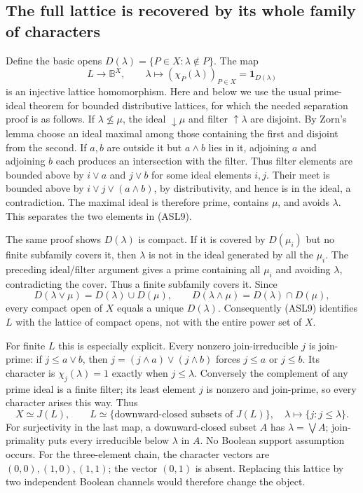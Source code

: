 \subsection{The full lattice is recovered by its whole family of characters}

Define the basic opens $D(\lambda)=\{P\in X:\lambda\notin P\}$.
The map
\begin{equation}\tag{ASL9}
 L\longrightarrow\mathbb B^X,\qquad
 \lambda\longmapsto(\chi_P(\lambda))_{P\in X}
                =\mathbf1_{D(\lambda)}
\end{equation}
is an injective lattice homomorphism. Here and below we use the usual
prime-ideal theorem for bounded distributive lattices, for which the
needed separation proof is as follows. If $\lambda\nleq\mu$, the
ideal $\downarrow\mu$ and filter $\uparrow\lambda$ are disjoint.
By Zorn's lemma choose an ideal maximal among those containing the
first and disjoint from the second. If $a,b$ are outside it but
$a\wedge b$ lies in it, adjoining $a$ and adjoining $b$ each produces
an intersection with the filter. Thus filter elements are bounded
above by $i\vee a$ and $j\vee b$ for some ideal elements $i,j$.
Their meet is bounded above by $i\vee j\vee(a\wedge b)$, by
distributivity, and hence is in the ideal, a contradiction. The
maximal ideal is therefore prime, contains $\mu$, and avoids
$\lambda$. This separates the two elements in (ASL9).

The same proof shows $D(\lambda)$ is compact. If it is covered by
$D(\mu_i)$ but no finite subfamily covers it, then $\lambda$ is not
in the ideal generated by all the $\mu_i$. The preceding ideal/filter
argument gives a prime containing all $\mu_i$ and avoiding $\lambda$,
contradicting the cover. Thus a finite subfamily covers it. Since
\begin{equation}\tag{ASL10}
 D(\lambda\vee\mu)=D(\lambda)\cup D(\mu),\qquad
 D(\lambda\wedge\mu)=D(\lambda)\cap D(\mu),
\end{equation}
every compact open of $X$ equals a unique $D(\lambda)$. Consequently
(ASL9) identifies $L$ with the lattice of compact opens, not with the
entire power set of $X$.

For finite $L$ this is especially explicit. Every nonzero
join-irreducible $j$ is join-prime: if $j\le a\vee b$, then
$j=(j\wedge a)\vee(j\wedge b)$ forces $j\le a$ or $j\le b$.
Its character is $\chi_j(\lambda)=1$ exactly when $j\le\lambda$.
Conversely the complement of any prime ideal is a finite filter;
its least element $j$ is nonzero and join-prime, so every character
arises this way. Thus
\begin{equation}\tag{ASL11}
 X\simeq J(L),\qquad
 L\simeq\{\text{downward-closed subsets of }J(L)\},
 \quad \lambda\longmapsto\{j:j\le\lambda\}.
\end{equation}
For surjectivity in the last map, a downward-closed subset $A$ has
$\lambda=\bigvee A$; join-primality puts every irreducible below
$\lambda$ in $A$. No Boolean support assumption occurs. For the
three-element chain, the character vectors are $(0,0),(1,0),(1,1)$;
the vector $(0,1)$ is absent. Replacing this lattice by two independent
Boolean channels would therefore change the object.

